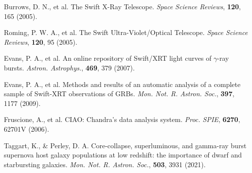 \documentclass{nature_plusfigure}
\newcommand{\mn}{{Mon. Not. R. Astron. Soc.}}
\newcommand{\mnras}{\mn}
\newcommand{\apj}{{Astrophys. J.}}
\newcommand{\aap}{{Astron. Astrophys.}}
\newcommand{\procspie}{Proc. SPIE}
\newcommand{\ssr}{Space Science Reviews}
\begin{document}
\begin{methods}
\begin{thebibliography}{10}
 Burrows, D. N., et al. The Swift X-Ray Telescope. \emph{\ssr}, \textbf{120}, 165 (2005). 

 Roming, P. W. A., et al. The Swift Ultra-Violet/Optical Telescope. \emph{\ssr}, \textbf{120}, 95 (2005).

 Evans, P. A., et al. An online repository of Swift/XRT light curves of $\gamma$-ray bursts. \emph{\aap}, \textbf{469}, 379 (2007). 

 Evans, P. A., et al. Methods and results of an automatic analysis of a complete sample of Swift-XRT observations of GRBs. \emph{\mnras}, \textbf{397}, 1177 (2009). 

 Fruscione, A., et al. CIAO: Chandra's data analysis system. \emph{\procspie}, \textbf{6270}, 62701V (2006). 


 Taggart, K., \& Perley, D. A. Core-collapse, superluminous, and gamma-ray burst supernova host galaxy populations at low redshift: the importance of dwarf and starbursting galaxies. \emph{\mnras}, \textbf{503}, 3931 (2021). 


%
%
%

\end{thebibliography}

\end{methods}

\clearpage
\end{document}
